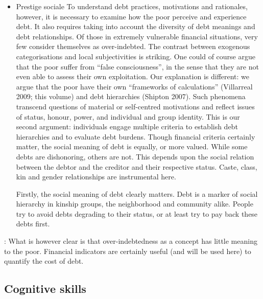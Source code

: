 \documentclass[a4paper, 11pt, onecolumn]{article}
\begin{document}
\begin{itemize}
\item Prestige sociale
\cite{Guerin2014a}
To understand debt practices, motivations and rationales, however, it is necessary to examine
how the poor perceive and experience debt. It also requires taking into account the diversity
of debt meanings and debt relationships. Of those in extremely vulnerable financial situations,
very few consider themselves as over-indebted. The contrast between exogenous
categorisations and local subjectivities is striking. One could of course argue that the poor
suffer from “false consciousness”, in the sense that they are not even able to assess their own
exploitation. Our explanation is different: we argue that the poor have their own “frameworks
of calculations” (Villarreal 2009; this volume) and debt hierarchies (Shipton 2007). Such
phenomena transcend questions of material or self-centred motivations and reflect issues of
status, honour, power, and individual and group identity. This is our second argument:
individuals engage multiple criteria to establish debt hierarchies and to evaluate debt burdens.
Though financial criteria certainly matter, the social meaning of debt is equally, or more
valued. While some debts are dishonoring, others are not. This depends upon the social
relation between the debtor and the creditor and their respective status. Caste, class, kin and
gender relationships are instrumental here.

\cite{Guerin2014}
Firstly, the social meaning of debt clearly matters. Debt is a marker of social hierarchy in
kinship groups, the neighborhood and community alike. People try to avoid debts degrading
to their status, or at least try to pay back these debts first.

\end{itemize}


\cite{Guerin2014a} : What is however clear is that over-indebtedness as a concept has little meaning to the poor.
Financial indicators are certainly useful (and will be used here) to quantify the cost of debt.









	\subsection{Cognitive skills}

\end{document}
